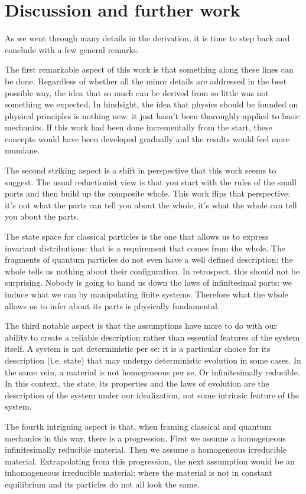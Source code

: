 \documentclass[smallextended]{svjour3}
\numberwithin{equation}{section}
\theoremstyle{definition}
\begin{document}
\section{Discussion and further work}
\label{sec:discussion}

As we went through many details in the derivation, it is time to step back and conclude with a few general remarks.

The first remarkable aspect of this work is that something along these lines can be done. Regardless of whether all the minor details are addressed in the best possible way, the idea that so much can be derived from so little was not something we expected. In hindsight, the idea that physics should be founded on physical principles is nothing new: it just hasn't been thoroughly applied to basic mechanics. If this work had been done incrementally from the start, these concepts would have been developed gradually and the results would feel more mundane.

The second striking aspect is a shift in perspective that this work seems to suggest. The usual reductionist view is that you start with the rules of the small parts and then build up the composite whole. This work flips that perspective: it's not what the parts can tell you about the whole, it's what the whole can tell you about the parts.

The state space for classical particles is the one that allows us to express invariant distributions: that is a requirement that comes from the whole. The fragments of quantum particles do not even have a well defined description: the whole tells us nothing about their configuration. In retrospect, this should not be surprising. Nobody is going to hand us down the laws of infinitesimal parts: we induce  what we can by manipulating finite systems. Therefore what the whole allows us to infer about its parts is physically fundamental.

The third notable aspect is that the assumptions have more to do with our ability to create a reliable description rather than essential features of the system itself. A system is not deterministic per se: it is a particular choice for its description (i.e. state) that may undergo deterministic evolution in some cases. In the same vein, a material is not homogeneous per se. Or infinitesimally reducible. In this context, the state, its properties and the laws of evolution are the description of the system under our idealization, not some intrinsic feature of the system.

The fourth intriguing aspect is that, when framing classical and quantum mechanics in this way, there is a progression. First we assume a homogeneous infinitesimally reducible material. Then we assume a homogeneous irreducible material. Extrapolating from this progression, the next assumption would be an inhomogeneous irreducible material: where the material is not in constant equilibrium and its particles do not all look the same.
\end{document}
